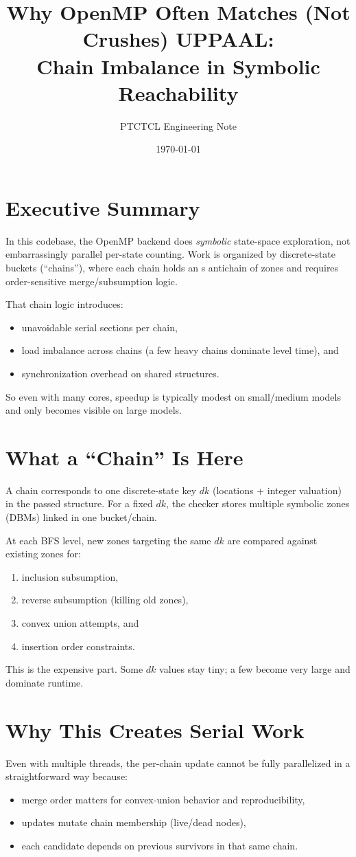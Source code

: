 \documentclass[11pt,a4paper]{article}
\title{Why OpenMP Often Matches (Not Crushes) UPPAAL:\\
Chain Imbalance in Symbolic Reachability}
\author{PTCTCL Engineering Note}
\date{\today}
\begin{document}
\maketitle

\section{Executive Summary}
In this codebase, the OpenMP backend does \emph{symbolic} state-space exploration, not embarrassingly parallel per-state counting. Work is organized by discrete-state buckets (``chains''), where each chain holds an s antichain of zones and requires order-sensitive merge/subsumption logic.

That chain logic introduces:
\begin{itemize}
  \item unavoidable serial sections per chain,
  \item load imbalance across chains (a few heavy chains dominate level time), and
  \item synchronization overhead on shared structures.
\end{itemize}

So even with many cores, speedup is typically modest on small/medium models and only becomes visible on large models.

\section{What a ``Chain'' Is Here}
A chain corresponds to one discrete-state key $dk$ (locations + integer valuation) in the passed structure.
For a fixed $dk$, the checker stores multiple symbolic zones (DBMs) linked in one bucket/chain.

At each BFS level, new zones targeting the same $dk$ are compared against existing zones for:
\begin{enumerate}
  \item inclusion subsumption,
  \item reverse subsumption (killing old zones),
  \item convex union attempts, and
  \item insertion order constraints.
\end{enumerate}

This is the expensive part. Some $dk$ values stay tiny; a few become very large and dominate runtime.

\section{Why This Creates Serial Work}
Even with multiple threads, the per-chain update cannot be fully parallelized in a straightforward way because:
\begin{itemize}
  \item merge order matters for convex-union behavior and reproducibility,
  \item updates mutate chain membership (live/dead nodes),
  \item each candidate depends on previous survivors in that same chain.
\end{itemize}
\end{document}
